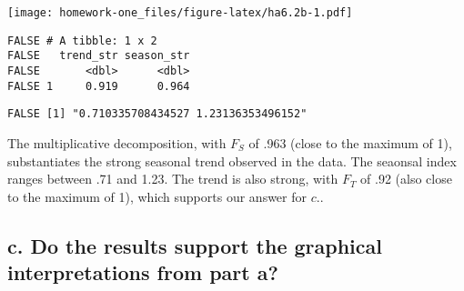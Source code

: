 \documentclass[openany]{book}
\newenvironment{Shaded}{\begin{snugshade}}{\end{snugshade}}
\newcommand{\CommentTok}[1]{\textcolor[rgb]{0.56,0.35,0.01}{\textit{#1}}}
\newcommand{\ControlFlowTok}[1]{\textcolor[rgb]{0.13,0.29,0.53}{\textbf{#1}}}
\newcommand{\DataTypeTok}[1]{\textcolor[rgb]{0.13,0.29,0.53}{#1}}
\newcommand{\KeywordTok}[1]{\textcolor[rgb]{0.13,0.29,0.53}{\textbf{#1}}}
\newcommand{\NormalTok}[1]{#1}
\newcommand{\OperatorTok}[1]{\textcolor[rgb]{0.81,0.36,0.00}{\textbf{#1}}}
\newcommand{\StringTok}[1]{\textcolor[rgb]{0.31,0.60,0.02}{#1}}
\begin{document}
\texttt{[image: homework-one\_files/figure-latex/ha6.2b-1.pdf]}

\begin{Shaded}
\end{Shaded}

\begin{verbatim}
FALSE # A tibble: 1 x 2
FALSE   trend_str season_str
FALSE       <dbl>      <dbl>
FALSE 1     0.919      0.964
\end{verbatim}

\begin{Shaded}
\end{Shaded}

\begin{verbatim}
FALSE [1] "0.710335708434527 1.23136353496152"
\end{verbatim}

The multiplicative decomposition, with \(F_S\) of .963 (close to the maximum of 1), substantiates the strong seasonal trend observed in the data. The seaonsal index ranges between .71 and 1.23. The trend is also strong, with \(F_T\) of .92 (also close to the maximum of 1), which supports our answer for \(c.\).

\hypertarget{c.-do-the-results-support-the-graphical-interpretations-from-part-a}{%
\subsection{c. Do the results support the graphical interpretations from part a?}\label{c.-do-the-results-support-the-graphical-interpretations-from-part-a}}
\end{document}
